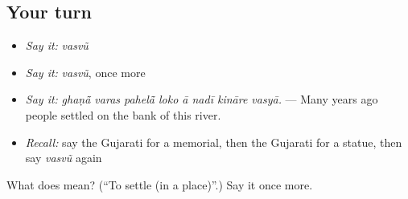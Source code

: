 \subsection*{Your turn}
\begin{itemize}
\raggedright
  \item \emph{Say it:} \emph{vasvũ}
  \item \emph{Say it:} \emph{vasvũ}, once more
  \item \emph{Say it:} \emph{ghaṇā̃ varas pahelā̃ loko ā nadī kināre vasyā.} — Many years ago people settled on the bank of this river.
  \item \emph{Recall:} say the Gujarati for a memorial, then the Gujarati for a statue, then say \emph{vasvũ} again
\end{itemize}

\begin{tcolorbox}[breakable,colback=teal!4,colframe=teal!35!black,title={Before you move on}]
What does  mean? (\textquotedblleft{}To settle (in a place)\textquotedblright{}.) Say it once more.
\end{tcolorbox}
